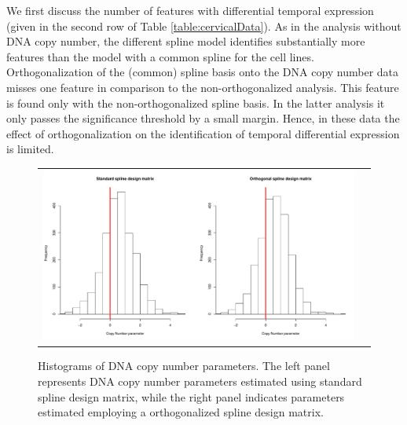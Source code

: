 We first discuss the number of features with differential temporal expression (given in the second row of Table \ref{table:cervicalData}). As in the analysis without DNA copy number, the different spline model identifies substantially more features than the model with a common spline for the cell lines. Orthogonalization of the (common) spline basis onto the DNA copy number data misses one feature in comparison to the non-orthogonalized analysis. This feature is found only with the non-orthogonalized spline basis. In the latter analysis it only passes the significance threshold by a small margin. Hence, in these data the effect of orthogonalization on the identification of temporal differential expression is limited.

\begin{figure}[h!]
\centering
\begin{tabular}{cc}
\includegraphics[scale=0.4]{Figure4.pdf}
\end{tabular}
\caption{Histograms of DNA copy number parameters. The left panel represents
 DNA copy number parameters estimated using standard spline design matrix, 
 while the right panel indicates parameters estimated employing a orthogonalized
 spline design matrix.}
\label{fig:orthogonal}
\end{figure}

